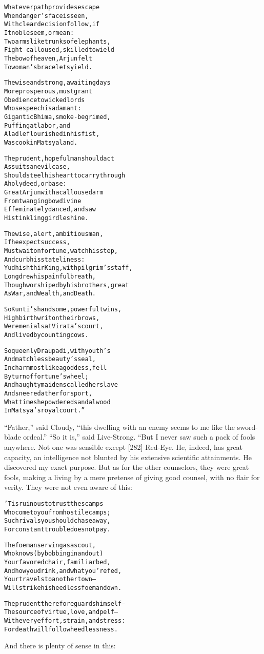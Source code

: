 \documentclass{article}
\renewenvironment{verbatim}{\begin{alltt}\normalfont\begin{centering}}{\end{centering}\end{alltt}}
\begin{document}
\begin{verbatim}
Whatever path provides escape
    When danger's face is seen,
With clear decision follow, if
    It noble seem, or mean:
Two arms like trunks of elephants,
    Fight-calloused, skilled to wield
The bow of heaven, Arjun felt
    To woman's bracelets yield.

The wise and strong, awaiting days
    More prosperous, must grant
Obedience to wicked lords
    Whose speech is adamant:
Gigantic Bhima, smoke-begrimed,
    Puffing at labor, and
A ladle flourished in his fist,
    Was cook in Matsya land.

The prudent, hopeful man should act
    As suits an evil case,
Should steel his heart to carry through
    A holy deed, or base:
Great Arjun with a calloused arm
    From twanging bow divine
Effeminately danced, and saw
    His tinkling girdle shine.

The wise, alert, ambitious man,
    If he expect success,
Must wait on fortune, watch his step,
    And curb his stateliness:
Yudhishthir King, with pilgrim's staff,
    Long drew his painful breath,
Though worshiped by his brothers, great
    As War, and Wealth, and Death.

So Kunti's handsome, powerful twins,
    High birth writ on their brows,
Were menials at Virata's court,
    And lived by counting cows.

So queenly Draupadi, with youth's
    And matchless beauty's seal,
In charm most like a goddess, fell
    By turn of fortune's wheel;
And haughty maidens called her slave
    And sneered at her for sport,
What time she powdered sandalwood
    In Matsya's royal court.”
\end{verbatim}
``Father,'' said Cloudy,
``this dwelling with an enemy seems to me like the sword-blade ordeal.''
``So it is,'' said Live-Strong. “But I never saw such a pack of
fools anywhere. Not one was sensible except [282] Red-Eye. He,
indeed, has great capacity, an intelligence not blunted by his
extensive scientific attainments. He discovered my exact purpose.
But as for the other counselors, they were great fools, making a
living by a mere pretense of giving good counsel, with no flair for
verity. They were not even aware of this:

\begin{verbatim}
'Tis ruinous to trust the scamps
Who come to you from hostile camps;
Such rivals you should chase away,
For constant trouble does not pay.

The foeman serving as a scout,
Who knows (by bobbing in and out)
Your favored chair, familiar bed,
And how you drink, and what you're fed,
Your travels to another town--
Will strike his heedless foeman down.

The prudent therefore guards himself--
The source of virtue, love, and pelf--
With every effort, strain, and stress:
For death will follow heedlessness.
\end{verbatim}
And there is plenty of sense in this:
\end{document}
